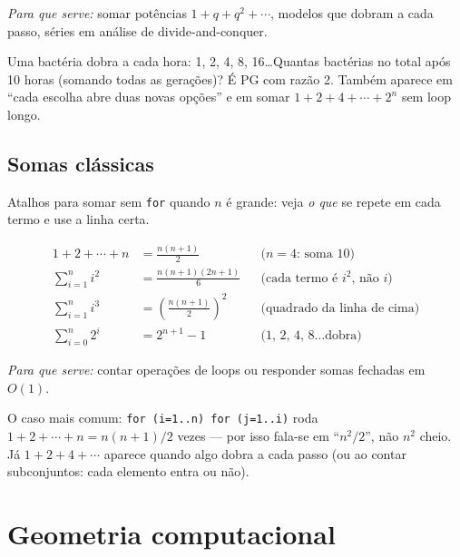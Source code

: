 \emph{Para que serve:} somar potências $1 + q + q^2 + \cdots$, modelos que dobram a cada passo, séries em análise de divide-and-conquer.

\begin{exemplodiabox}
Uma bactéria dobra a cada hora: 1, 2, 4, 8, 16\ldots Quantas bactérias no total após 10 horas (somando todas as gerações)? É PG com razão 2. Também aparece em ``cada escolha abre duas novas opções'' e em somar $1 + 2 + 4 + \cdots + 2^n$ sem loop longo.
\end{exemplodiabox}



\subsection{Somas clássicas}

Atalhos para somar sem \texttt{for} quando $n$ é grande: veja \emph{o que} se repete em cada termo e use a linha certa.

\begin{align}
  1 + 2 + \cdots + n &= \frac{n(n+1)}{2} &
  &\text{($n{=}4$: soma $10$)} \\
  \sum_{i=1}^{n} i^2 &= \frac{n(n+1)(2n+1)}{6} &
  &\text{(cada termo é $i^2$, não $i$)} \\
  \sum_{i=1}^{n} i^3 &= \left(\frac{n(n+1)}{2}\right)^2 &
  &\text{(quadrado da linha de cima)} \\
  \sum_{i=0}^{n} 2^i &= 2^{n+1} - 1 &
  &\text{(1, 2, 4, 8\ldots dobra)}
\end{align}

\emph{Para que serve:} contar operações de loops ou responder somas fechadas em $O(1)$.

\begin{exemplodiabox}
O caso mais comum: \texttt{for (i=1..n) for (j=1..i)} roda $1+2+\cdots+n = n(n+1)/2$ vezes --- por isso fala-se em ``$n^2/2$'', não $n^2$ cheio. Já $1+2+4+\cdots$ aparece quando algo dobra a cada passo (ou ao contar subconjuntos: cada elemento entra ou não).
\end{exemplodiabox}



\section{Geometria computacional}

